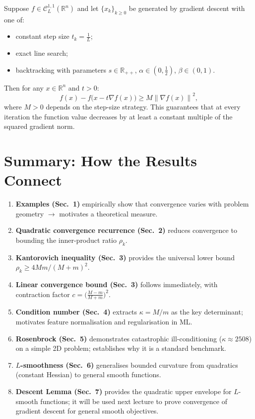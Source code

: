 \documentclass[11pt]{article}
\theoremstyle{definition}
\theoremstyle{plain}
\newcommand{\R}{\mathbb{R}}
\newcommand{\norm}[1]{\left\|#1\right\|}
\newcommand{\grad}{\nabla}
\begin{document}
\begin{tcolorbox}[colback=yellow!5!white,colframe=orange!80!black,
  title=Sufficient Decrease Lemma (Stated; Proof in Next Lecture)]
Suppose $f\in\mathcal{C}^{1,1}_L(\R^n)$ and let $\{x_k\}_{k\geq 0}$ be
generated by gradient descent with one of:
\begin{itemize}
  \item constant step size $t_k=\tfrac{1}{L}$;
  \item exact line search;
  \item backtracking with parameters $s\in\R_{++}$, $\alpha\in(0,\tfrac{1}{2})$, $\beta\in(0,1)$.
\end{itemize}
Then for any $x\in\R^n$ and $t>0$:
\[
  f(x) - f\!\bigl(x-t\grad f(x)\bigr) \geq M\norm{\grad f(x)}^2,
\]
where $M>0$ depends on the step-size strategy.
This guarantees that at every iteration the function value decreases
by at least a constant multiple of the squared gradient norm.
\end{tcolorbox}

\section{Summary: How the Results Connect}

\begin{tcolorbox}[colback=green!5!white,colframe=green!60!black,
  title=Lecture Flow and Key Connections]
\begin{enumerate}
  \item \textbf{Examples (Sec.~1)} empirically show that convergence varies with
    problem geometry $\to$ motivates a theoretical measure.
  \item \textbf{Quadratic convergence recurrence (Sec.~2)} reduces convergence
    to bounding the inner-product ratio $\rho_k$.
  \item \textbf{Kantorovich inequality (Sec.~3)} provides the universal lower bound
    $\rho_k\geq 4Mm/(M+m)^2$.
  \item \textbf{Linear convergence bound (Sec.~3)} follows immediately, with
    contraction factor $c=\bigl(\frac{M-m}{M+m}\bigr)^2$.
  \item \textbf{Condition number (Sec.~4)} extracts $\kappa=M/m$ as the key
    determinant; motivates feature normalisation and regularisation in ML.
  \item \textbf{Rosenbrock (Sec.~5)} demonstrates catastrophic ill-conditioning
    ($\kappa\approx2508$) on a simple 2D problem; establishes why it is
    a standard benchmark.
  \item \textbf{$L$-smoothness (Sec.~6)} generalises bounded curvature from
    quadratics (constant Hessian) to general smooth functions.
  \item \textbf{Descent Lemma (Sec.~7)} provides the quadratic upper envelope
    for $L$-smooth functions; it will be used next lecture to prove convergence
    of gradient descent for general smooth objectives.
\end{enumerate}
\end{tcolorbox}
\end{document}
